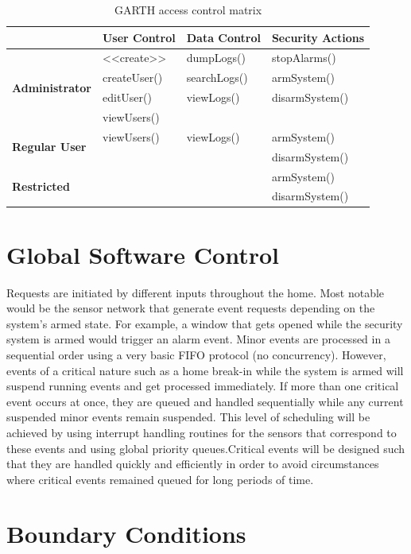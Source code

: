 \documentclass{report}
\begin{document}
\begin{table}[h]
    \caption{GARTH access control matrix}
    \label{access_control}
    \centering
    \begin{tabular}{| l | l | l | l |}
    \hline
    &\textbf{User Control}&\textbf{Data Control}&\textbf{Security Actions} \\ \hline
    \multirow{4}{*}{\textbf{Administrator}}&
    \textless\textless create\textgreater\textgreater&dumpLogs()&stopAlarms() \\
    &createUser()&searchLogs()&armSystem() \\ 
    &editUser()&viewLogs()&disarmSystem() \\
    &viewUsers()&& \\ \hline
    \multirow{2}{*}{\textbf{Regular User}}&viewUsers()&viewLogs()&armSystem() \\
    &&&disarmSystem() \\ \hline
    \multirow{2}{*}{\textbf{Restricted}}&&&armSystem() \\
    &&&disarmSystem() \\
    \hline
    \end{tabular}
\end{table}

\section{Global Software Control}

Requests are initiated by different inputs throughout the home. Most notable
would be the sensor network that generate event requests depending on the
system's armed state. For example, a window that gets opened while the security
system is armed would trigger an alarm event. Minor events are processed in a
sequential order using a very basic FIFO protocol (no concurrency). However,
events of a critical nature such as a home break-in while the system is armed
will suspend running events and get processed immediately. If more than one
critical event occurs at once, they are queued and handled sequentially while
any current suspended minor events remain suspended. This level of scheduling
will be achieved by using interrupt handling routines for the sensors that
correspond to these events and using global priority queues.Critical events
will be designed such that they are handled quickly and efficiently in order to
avoid circumstances where critical events remained queued for long periods of
time.

\section{Boundary Conditions}
\end{document}
